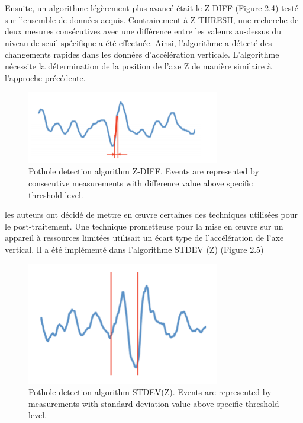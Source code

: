    Ensuite, un algorithme légèrement plus avancé était le Z-DIFF (Figure 2.4) testé sur l'ensemble de données acquis. Contrairement à Z-THRESH, une recherche de deux mesures consécutives avec une différence entre les valeurs au-dessus du niveau de seuil spécifique a été effectuée. Ainsi, l'algorithme a détecté des changements rapides dans les données d'accélération verticale. L'algorithme nécessite la détermination de la position de l'axe Z de manière similaire à l'approche précédente. \newline
    \begin{figure}[h!]
      \center
      \includegraphics[width=0.75\textwidth]{Images/chapter2/relatedWork4.PNG}
     \caption{Pothole detection algorithm Z-DIFF. Events are represented by
     consecutive measurements with difference value above specific threshold level.}
     \label{fig:graph}
      \end{figure}
      les auteurs ont décidé de mettre en œuvre certaines des techniques utilisées pour le post-traitement. Une technique prometteuse pour la mise en œuvre sur un appareil à ressources limitées utilisait un écart type de l'accélération de l'axe vertical. Il a été implémenté dans l'algorithme STDEV (Z) (Figure 2.5) \newline

   \begin{figure}[h!]
      \center
      \includegraphics[width=0.75\textwidth]{Images/chapter2/relatedWork5.PNG}
     \caption{Pothole detection algorithm STDEV(Z). Events are represented by
     measurements with standard deviation value above specific threshold level.}
     \label{fig:graph}
      \end{figure}

